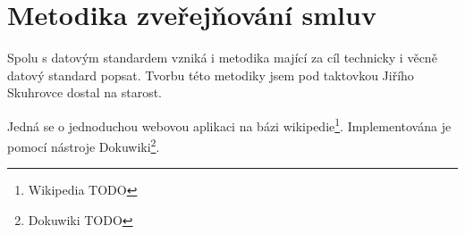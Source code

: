 \newpage

\section{Metodika zveřejňování smluv}

Spolu s datovým standardem vzniká i metodika mající za cíl technicky i věcně datový standard popsat. Tvorbu této metodiky jsem pod taktovkou Jiřího Skuhrovce dostal na starost.

Jedná se o jednoduchou webovou aplikaci na bázi wikipedie\footnote{Wikipedia TODO}. Implementována je pomocí nástroje Dokuwiki\footnote{Dokuwiki TODO}.\\


